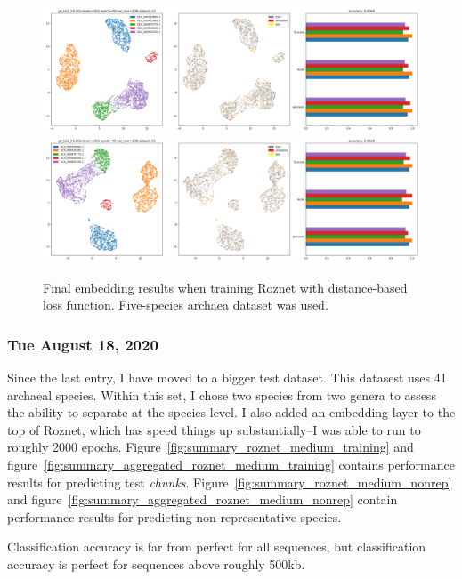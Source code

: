 \documentclass{article}
\begin{document}
\begin{figure}
  \includegraphics[width=\linewidth]{new_journal/figures/ar122_r89.genomic.small/ddp/g4_b32_lr0.001/seed=2001-epoch=80-val_loss=2.98.outputs.png}
  \includegraphics[width=\linewidth]{new_journal/figures/ar122_r89.genomic.small/ddp/g4_b32_lr0.001/seed=2001-epoch=95-val_loss=3.98.outputs.png}
  \caption{Final embedding results when training Roznet with distance-based loss function. Five-species archaea dataset was used.  }
  \label{fig:g4_b32_lr0.001}
\end{figure}


\subsubsection*{Tue August 18, 2020}
Since the last entry, I have moved to a bigger test dataset. This datasest uses 41 archaeal species. Within this set, I chose two species from two genera to assess
the ability to separate at the species level. I also added an embedding layer to the top of Roznet, which has speed things up substantially--I was able to run to
roughly 2000 epochs. Figure~\ref{fig:summary_roznet_medium_training} and figure~\ref{fig:summary_aggregated_roznet_medium_training} contains performance results for predicting test \emph{chunks}.
Figure~\ref{fig:summary_roznet_medium_nonrep} and figure~\ref{fig:summary_aggregated_roznet_medium_nonrep} contain performance results for predicting non-representative species.

Classification accuracy is far from perfect for all sequences, but classification accuracy is perfect for sequences above roughly 500kb.
\end{document}
